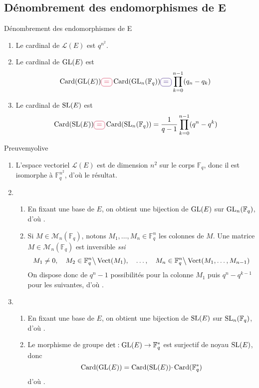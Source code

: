 \subsection{Dénombrement des endomorphismes de E}

    \begin{prop}{Dénombrement des endomorphismes de E}{}
        \begin{enumerate}
            \item Le cardinal de $\mathcal{L}(E)$ est $q^{n^2}$.
            \item Le cardinal de $\operatorname{GL}(E)$ est 
            \[ \card(\GL(E)) \lilbox{myred}{=} \card(\GL_n(\mathbb{F}_q)) \lilbox{mypurple}{=} \prod_{k=0}^{n-1} (q_n - q_k) \]
            \item Le cardinal de $\operatorname{SL}(E)$ est 
            \[ \card(\SL(E)) \lilbox{myred}{=} \card(\SL_n(\mathbb{F}_q)) = \frac{1}{q-1} \prod_{k=0}^{n-1} (q^n - q^k) \]
        \end{enumerate}
    \end{prop}

    \begin{demo}{Preuve}{myolive}
        \begin{enumerate}
            \item L’espace vectoriel $\mathcal{L}(E)$ est de dimension $n^2$ sur le corps $\mathbb{F}_q$, donc il est isomorphe à $\mathbb{F}_q^{n^2}$, d’où le résultat.
            \item \begin{enumerate}
                \item En fixant une base de $E$, on obtient une bijection de $\operatorname{GL}(E)$ sur $\operatorname{GL}_n(\mathbb{F}_q)$, d’où . 
                \item Si $M \in \mathcal{M}_n(\mathbb{F}_q)$, notons $M_1,\ldots,M_n \in \mathbb{F}_q^n$ les colonnes de $M$. Une matrice $M \in \mathcal{M}_n(\mathbb{F}_q)$ est inversible \textit{ssi} 
                \[ M_1 \neq 0, \quad  M_2 \in \mathbb{F}_q^n \big\backslash \operatorname{Vect}(M_1), \quad \ldots, \quad M_n \in \mathbb{F}_q^n \big\backslash \operatorname{Vect}(M_1,\ldots,M_{n-1}) \]
                On dispose donc de $q^n - 1$ possibilités pour la colonne $M_1$ puis $q^n - q^{k-1}$ pour les suivantes, d’où .
            \end{enumerate}
            \item \begin{enumerate}
                \item En fixant une base de $E$, on obtient une bijection de $\operatorname{SL}(E)$ sur $\operatorname{SL}_n(\mathbb{F}_q)$, d’où . 
                \item Le morphisme de groupe $\operatorname{det} : \operatorname{GL}(E) \to \mathbb{F}_q^*$ est surjectif de noyau $\operatorname{SL}(E)$, donc 
                \[ \operatorname{Card}(\operatorname{GL}(E)) = \operatorname{Card}(\operatorname{SL}(E)) \cdotp \operatorname{Card}(\mathbb{F}_q^*) \]   
                d’où .
            \end{enumerate}
        \end{enumerate}
    \end{demo}

